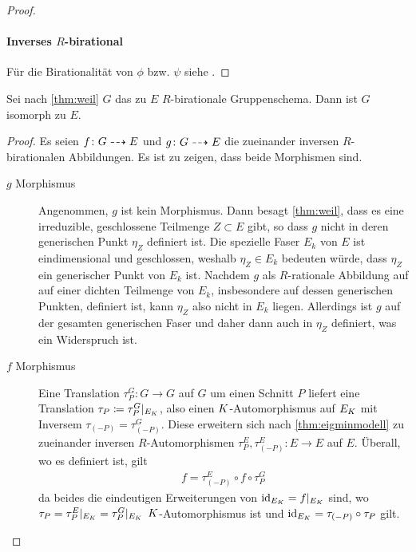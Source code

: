 \begin{Lemma}
\begin{proof}
    \paragraph{Inverses $R$-birational}
    Für die Birationalität von $\phi$ bzw. $\psi$ siehe
    \cite[Propsition IV.6.10]{silverman2}.
  \end{proof}
\end{Lemma}

\begin{Lemma}\label{thm:äqgruppenschema}
  Sei nach \ref{thm:weil} $G$ das zu $E$ $R$-birationale
  Gruppenschema. Dann ist $G$ isomorph zu $E$.
  \begin{proof}
    Es seien $f\colon G\dashrightarrow E$ und $g\colon G\dashrightarrow E$ die
    zueinander inversen $R$-birationalen Abbildungen.
    Es ist zu zeigen, dass beide Morphismen sind.
    \begin{description}
    \item[$g$ Morphismus] Angenommen, $g$ ist kein
      Morphismus. Dann besagt \ref{thm:weil}, dass es eine
      irreduzible, geschlossene Teilmenge $Z\subset E$ gibt, so
      dass $g$ nicht in deren generischen Punkt $\eta_Z$ definiert
      ist. Die spezielle Faser $E_k$ von $E$ ist eindimensional und
      geschlossen, weshalb $\eta_Z\in E_k$ bedeuten würde, dass
      $\eta_Z$ ein generischer Punkt von $E_k$ ist.
      Nachdem $g$ als $R$-rationale Abbildung auf auf einer
      dichten Teilmenge von $E_k$, insbesondere auf dessen
      generischen Punkten, definiert ist, kann $\eta_Z$ also nicht in
      $E_k$ liegen.
      Allerdings ist $g$ auf der gesamten generischen Faser und daher
      dann auch in $\eta_Z$ definiert, was ein Widerspruch ist.
    \item[$f$ Morphismus] Eine Translation $\tau_P^G\colon G\to G$
      auf $G$ um einen Schnitt $P$ liefert eine Translation
      $\tau_P\coloneqq\tau_P^G|_{E_{K}}$, also einen
      $K$-Automorphismus auf $E_{K}$ mit Inversem
      $\tau_{(-P)}=\tau_{(-P)}^G$. Diese 
      erweitern sich nach \ref{thm:eigminmodell} zu zueinander
      inversen $R$-Automorphismen
      $\tau_P^E,\tau_{(-P)}^E\colon E\to E$ auf $E$.
      Überall, wo es definiert ist, gilt
      \begin{gather*}
        f = \tau_{(-P)}^E\circ f\circ \tau_P^G
      \end{gather*}
      da beides die eindeutigen Erweiterungen von
      $\mathrm{id}_{E_{K}}=f|_{E_{K}}$ sind, wo
      $\tau_P=\tau_P^E|_{E_{K}}=\tau_P^G|_{E_{K}}$ $K$-Automorphismus
      ist und $\mathrm{id}_{E_{K}}=\tau_{(-P)}\circ\tau_P$ gilt.
      

\end{description}
\end{proof}
\end{Lemma}
